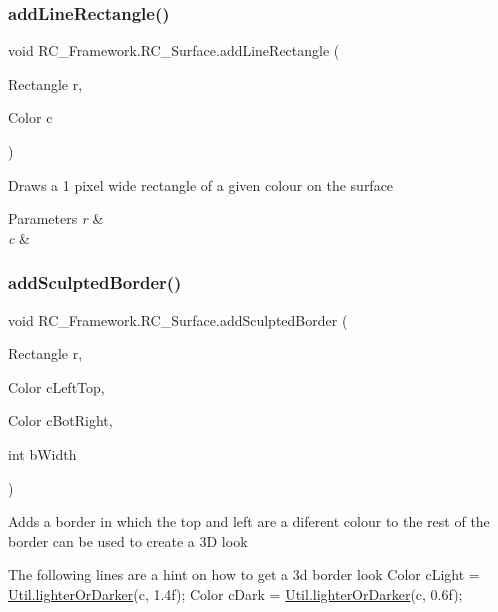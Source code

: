 \subsubsection{\texorpdfstring{add\+Line\+Rectangle()}{addLineRectangle()}}
{\footnotesize\ttfamily void R\+C\+\_\+\+Framework.\+R\+C\+\_\+\+Surface.\+add\+Line\+Rectangle (\begin{DoxyParamCaption}\item[{Rectangle}]{r,  }\item[{Color}]{c }\end{DoxyParamCaption})}



Draws a 1 pixel wide rectangle of a given colour on the surface 


\begin{DoxyParams}{Parameters}
{\em r} & \\
\hline
{\em c} & \\
\hline
\end{DoxyParams}
\mbox{\label{class_r_c___framework_1_1_r_c___surface_ad16458caf26de6edba572ce3ac85342c}} 
\subsubsection{\texorpdfstring{add\+Sculpted\+Border()}{addSculptedBorder()}}
{\footnotesize\ttfamily void R\+C\+\_\+\+Framework.\+R\+C\+\_\+\+Surface.\+add\+Sculpted\+Border (\begin{DoxyParamCaption}\item[{Rectangle}]{r,  }\item[{Color}]{c\+Left\+Top,  }\item[{Color}]{c\+Bot\+Right,  }\item[{int}]{b\+Width }\end{DoxyParamCaption})}



Adds a border in which the top and left are a diferent colour to the rest of the border can be used to create a 3D look 

The following lines are a hint on how to get a 3d border look Color c\+Light = \mbox{\hyperlink{class_r_c___framework_1_1_util_a88559e70851ee1e21bdc1375b862919d}{Util.\+lighter\+Or\+Darker}}(c, 1.\+4f); Color c\+Dark = \mbox{\hyperlink{class_r_c___framework_1_1_util_a88559e70851ee1e21bdc1375b862919d}{Util.\+lighter\+Or\+Darker}}(c, 0.\+6f); 


